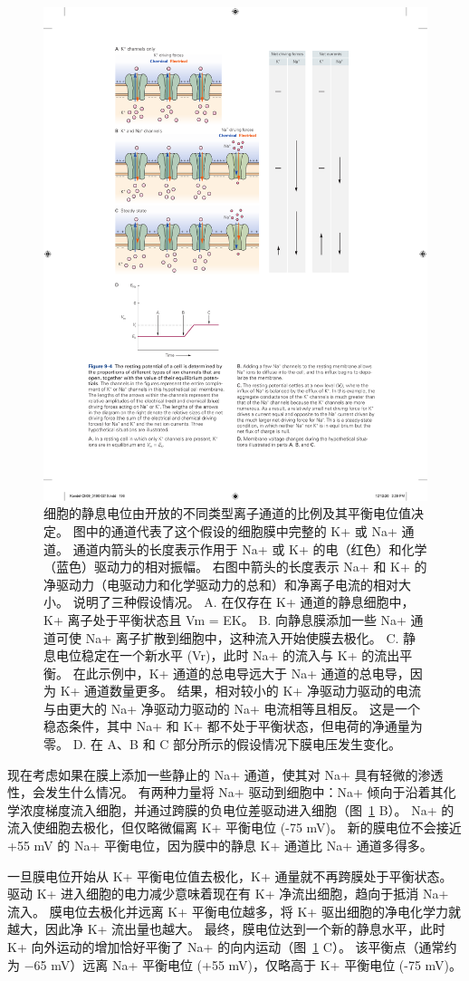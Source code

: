 \begin{figure}[htbp]
	\centering
	\includegraphics[width=0.7\linewidth]{chap09/fig_9_4}
	\caption{细胞的静息电位由开放的不同类型离子通道的比例及其平衡电位值决定。 图中的通道代表了这个假设的细胞膜中完整的 K+ 或 Na+ 通道。 通道内箭头的长度表示作用于 Na+ 或 K+ 的电（红色）和化学（蓝色）驱动力的相对振幅。 右图中箭头的长度表示 Na+ 和 K+ 的净驱动力（电驱动力和化学驱动力的总和）和净离子电流的相对大小。 说明了三种假设情况。 A. 在仅存在 K+ 通道的静息细胞中，K+ 离子处于平衡状态且 Vm = EK。 B. 向静息膜添加一些 Na+ 通道可使 Na+ 离子扩散到细胞中，这种流入开始使膜去极化。 C. 静息电位稳定在一个新水平 (Vr)，此时 Na+ 的流入与 K+ 的流出平衡。 在此示例中，K+ 通道的总电导远大于 Na+ 通道的总电导，因为 K+ 通道数量更多。 结果，相对较小的 K+ 净驱动力驱动的电流与由更大的 Na+ 净驱动力驱动的 Na+ 电流相等且相反。 这是一个稳态条件，其中 Na+ 和 K+ 都不处于平衡状态，但电荷的净通量为零。 D. 在 A、B 和 C 部分所示的假设情况下膜电压发生变化。}
	\label{fig:9_4}
\end{figure}


现在考虑如果在膜上添加一些静止的 Na+ 通道，使其对 Na+ 具有轻微的渗透性，会发生什么情况。
有两种力量将 Na+ 驱动到细胞中：Na+ 倾向于沿着其化学浓度梯度流入细胞，并通过跨膜的负电位差驱动进入细胞（图~\ref{fig:9_4} B）。
Na+ 的流入使细胞去极化，但仅略微偏离 K+ 平衡电位 (-75 mV)。
新的膜电位不会接近 +55 mV 的 Na+ 平衡电位，因为膜中的静息 K+ 通道比 Na+ 通道多得多。


一旦膜电位开始从 K+ 平衡电位值去极化，K+ 通量就不再跨膜处于平衡状态。
驱动 K+ 进入细胞的电力减少意味着现在有 K+ 净流出细胞，趋向于抵消 Na+ 流入。
膜电位去极化并远离 K+ 平衡电位越多，将 K+ 驱出细胞的净电化学力就越大，因此净 K+ 流出量也越大。
最终，膜电位达到一个新的静息水平，此时 K+ 向外运动的增加恰好平衡了 Na+ 的向内运动（图~\ref{fig:9_4} C）。
该平衡点（通常约为 −65 mV）远离 Na+ 平衡电位 (+55 mV)，仅略高于 K+ 平衡电位 (-75 mV)。


